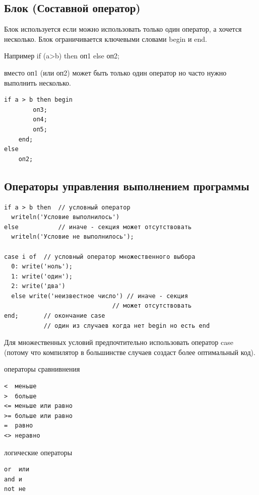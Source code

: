 \documentclass[unicode, 12pt, a4paper,oneside,fleqn]{article}
\begin{document}
\subsection{Блок (Составной оператор)}
Блок используется если можно использовать только один оператор, а
хочется несколько. Блок ограничивается ключевыми словами begin и end.

Например if (a>b) then оп1 else оп2;

вместо оп1 (или оп2) может быть только один оператор но часто нужно
выполнить несколько.

\begin{verbatim}
if a > b then begin
        оп3;
        оп4;
        оп5;
    end;
else
    оп2;
\end{verbatim}




\subsection{Операторы управления выполнением программы}
\begin{verbatim}
if a > b then  // условный оператор
  writeln('Условие выполнилось')
else           // иначе - секция может отсутствовать
  writeln('Условие не выполнилось');

case i of  // условный оператор множественного выбора
  0: write('ноль');
  1: write('один');
  2: write('два')
  else write('неизвестное число') // иначе - секция
                              // может отсутствовать
end;       // окончание case
           // один из случаев когда нет begin но есть end
\end{verbatim}

Для множественных условий предпочтительно использовать оператор case
(потому что компилятор в большинстве случаев создаст более оптимальный
код).

операторы сравнивнения
\begin{verbatim}
<  меньше
>  больше
<= меньше или равно
>= больше или равно
=  равно
<> неравно
\end{verbatim}

логические операторы
\begin{verbatim}
or  или
and и
not не
\end{verbatim}
\end{document}
